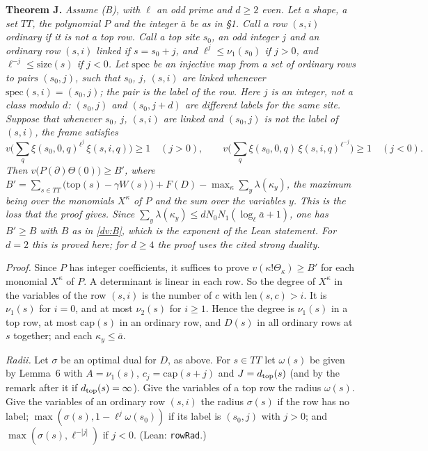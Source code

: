 \documentclass[11pt,letterpaper]{article}
\begin{document}
\textbf{Theorem J.} \emph{Assume \textup{(B)}, with $\ell$ an odd prime and $d\ge2$ even. Let a shape, a set
$\mathit{TT}$, the polynomial $P$ and the integer $\bar a$ be as in \S1. Call a row $(s,i)$ \emph{ordinary} if it
is not a top row. Call a top site $s_0$, an odd integer $j$ and an ordinary row $(s,i)$ \emph{linked} if $s=s_0+j$, and
$\ell^j\le\nu_1(s_0)$ if $j>0$, and $\ell^{-j}\le\mathrm{size}(s)$ if $j<0$. Let $\mathrm{spec}$ be an
injective map from a set of ordinary rows to pairs $(s_0,j)$, such that $s_0$, $j$, $(s,i)$ are linked
whenever $\mathrm{spec}(s,i)=(s_0,j)$; the pair is the \emph{label} of the row. Here $j$ is an integer, not a class modulo $d$: $(s_0,j)$ and
$(s_0,j+d)$ are different labels for the same site. Suppose that whenever $s_0$,
$j$, $(s,i)$ are linked and $(s_0,j)$ is not the label of $(s,i)$, the frame satisfies}
\begin{equation}\label{dv:frame}
 v\Big(\sum_{q}\xi(s_0,0,q)^{\ell^{j}}\,\xi(s,i,q)\Big)\ge1\quad(j>0),\qquad
 v\Big(\sum_{q}\xi(s_0,0,q)\,\xi(s,i,q)^{\ell^{-j}}\Big)\ge1\quad(j<0).
\end{equation}
\emph{Then $v\big(P(\partial)\Theta(0)\big)\ge B'$, where
$B'=\sum_{s\in\mathit{TT}}\big(\mathrm{top}(s)-\gamma W(s)\big)+F(D)-\max_\kappa\sum_y\lambda(\kappa_y)$, the
maximum being over the monomials $X^\kappa$ of $P$ and the sum over the variables $y$. This is the loss that
the proof gives. Since $\sum_y\lambda(\kappa_y)\le dN_0N_1(\log_\ell\bar a+1)$, one has $B'\ge B$ with $B$ as in
\eqref{dv:B}, which is the exponent of the Lean statement. For $d=2$ this is proved
here; for $d\ge4$ the proof uses the cited strong duality.}

\emph{Proof.} Since $P$ has integer coefficients, it suffices to prove $v(\kappa!\Theta_\kappa)\ge B'$ for
each monomial $X^\kappa$ of $P$. A determinant is linear in each row. So the degree of $X^\kappa$ in the
variables of the row $(s,i)$ is the number of $c$ with $\mathrm{len}(s,c)>i$. It is $\nu_1(s)$ for $i=0$, and at most
$\nu_2(s)$ for $i\ge1$. Hence the degree is $\nu_1(s)$ in a top row, at most $\mathrm{cap}(s)$ in an
ordinary row, and $D(s)$ in all ordinary rows at $s$ together; and each $\kappa_y\le\bar a$.

\emph{Radii.} Let $\sigma$ be an optimal dual for $D$, as above. For $s\in\mathit{TT}$ let $\omega(s)$
be given by Lemma~6 with $A=\nu_1(s)$, $c_j=\mathrm{cap}(s+j)$ and $J=d_{\rm top}(s)$ (and by the remark
after it if $d_{\rm top}(s)=\infty$). Give the variables of a top row the radius $\omega(s)$. Give the
variables of an ordinary row $(s,i)$ the radius $\sigma(s)$ if the row has no label;
$\max(\sigma(s),1-\ell^j\omega(s_0))$ if its label is $(s_0,j)$ with $j>0$; and
$\max(\sigma(s),\ell^{-|j|})$ if $j<0$. (Lean: \texttt{rowRad}.)
\end{document}
